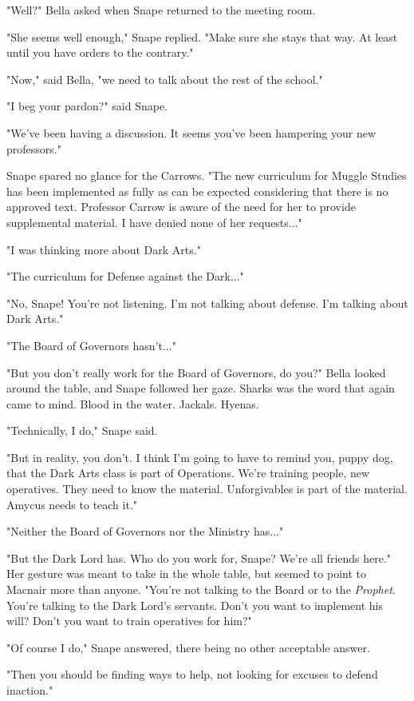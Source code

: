 "Well?" Bella asked when Snape returned to the meeting room.

"She seems well enough," Snape replied. "Make sure she stays that way. At least until you have orders to the contrary."

"Now," said Bella, "we need to talk about the rest of the school."

"I beg your pardon?" said Snape.

"We've been having a discussion. It seems you've been hampering your new professors."

Snape spared no glance for the Carrows. "The new curriculum for Muggle Studies has been implemented as fully as can be expected considering that there is no approved text. Professor Carrow is aware of the need for her to provide supplemental material. I have denied none of her requests..."

"I was thinking more about Dark Arts."

"The curriculum for Defense against the Dark..."

"No, Snape! You're not listening. I'm not talking about defense. I'm talking about Dark Arts."

"The Board of Governors hasn't..."

"But you don't really work for the Board of Governors, do you?" Bella looked around the table, and Snape followed her gaze. Sharks was the word that again came to mind. Blood in the water. Jackals. Hyenas.

"Technically, I do," Snape said.

"But in reality, you don't. I think I'm going to have to remind you, puppy dog, that the Dark Arts class is part of Operations. We're training people, new operatives. They need to know the material. Unforgivables is part of the material. Amycus needs to teach it."

"Neither the Board of Governors nor the Ministry has..."

"But the Dark Lord has. Who do you work for, Snape? We're all friends here." Her gesture was meant to take in the whole table, but seemed to point to Macnair more than anyone. "You're not talking to the Board or to the \emph{Prophet}. You're talking to the Dark Lord's servants. Don't you want to implement his will? Don't you want to train operatives for him?"

"Of course I do," Snape answered, there being no other acceptable answer.

"Then you should be finding ways to help, not looking for excuses to defend inaction."


